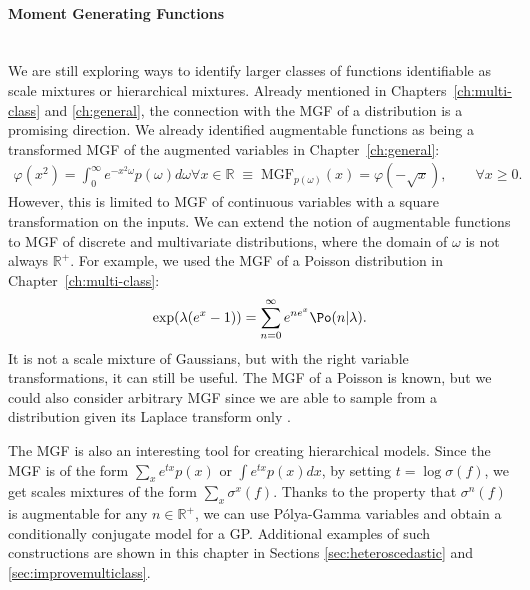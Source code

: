 \paragraph{Moment Generating Functions}\mbox{}\\
We are still exploring ways to identify larger classes of functions identifiable as scale mixtures or hierarchical mixtures.
Already mentioned in Chapters~\ref{ch:multi-class} and \ref{ch:general},
the connection with the \acf{MGF} of a distribution is a promising direction.
We already identified augmentable functions as being a transformed \ac{MGF} of the augmented variables in Chapter~\ref{ch:general}:
\begin{align*}
    \varphi(x^2) = \int_0^\infty e^{-x^2\omega}p(\omega)d\omega \forall x \in \mathbb{R} \;\equiv\; \mathrm{MGF}_{p(\omega)}(x) = \varphi(-\sqrt{x}),\qquad \forall x \geq 0.
\end{align*}
However, this is limited to \ac{MGF} of continuous variables with a square transformation on the inputs.
We can extend the notion of augmentable functions to \ac{MGF} of discrete and multivariate distributions, where the domain of $\omega$ is not always $\mathbb{R}^+$.
For example, we used the \ac{MGF} of a Poisson distribution in Chapter~\ref{ch:multi-class}:
\begin{align*}
    \exp(\lambda(e^x - 1)) = \sum_{n=0}^\infty e^{n e^x} \Po(n|\lambda).
\end{align*}
It is not a scale mixture of Gaussians, but with the right variable transformations, it can still be useful.
The \ac{MGF} of a Poisson is known, but we could also consider arbitrary \ac{MGF} since we are able to sample from a distribution given its Laplace transform only \cite{ridout2009generating}.

The \ac{MGF} is also an interesting tool for creating hierarchical models. 
Since the \ac{MGF} is of the form $\sum_{x} e^{tx} p(x)$ or $\int e^{tx}p(x)dx$, by setting $t=\log \sigma(f)$, we get scales mixtures of the form $\sum_x \sigma^x(f)$.
Thanks to the property that $\sigma^n(f)$ is augmentable for any $n\in \mathbb{R}^+$, we can use P\'olya-Gamma variables and obtain a conditionally conjugate model for a \ac{GP}.
Additional examples of such constructions are shown in this chapter in Sections \ref{sec:heteroscedastic} and \ref{sec:improvemulticlass}.

